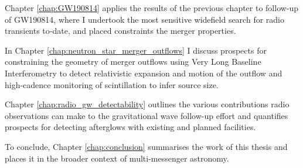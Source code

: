 Chapter \ref{chap:GW190814} applies the results of the previous chapter to follow-up of GW190814, where I undertook the most sensitive widefield search for radio transients to-date, and placed constraints the merger properties.

In Chapter \ref{chap:neutron_star_merger_outflows} I discuss prospects for constraining the geometry of merger outflows using Very Long Baseline Interferometry to detect relativistic expansion and motion of the outflow and high-cadence monitoring of scintillation to infer source size.

Chapter \ref{chap:radio_gw_detectability} outlines the various contributions radio observations can make to the gravitational wave follow-up effort and quantifies prospects for detecting afterglows with existing and planned facilities.

To conclude, Chapter \ref{chap:conclusion} summarises the work of this thesis and places it in the broader context of multi-messenger astronomy.


